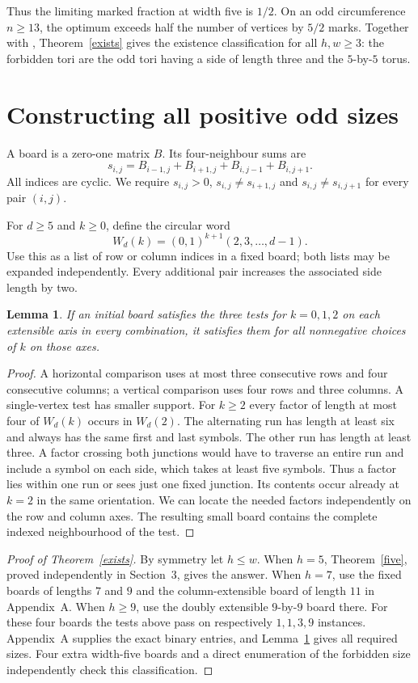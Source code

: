 \documentclass[11pt,a4paper]{article}
\newtheorem{lemma}[theorem]{Lemma}
\begin{document}
Thus the limiting marked fraction at width five is $1/2$. On an odd circumference $n\ge13$, the optimum exceeds half the number of vertices by $5/2$ marks. Together with \cite{princes}, Theorem~\ref{exists} gives the existence classification for all $h,w\ge3$: the forbidden tori are the odd tori having a side of length three and the $5$-by-$5$ torus.

\clearpage
\section{Constructing all positive odd sizes}
A board is a zero-one matrix $B$. Its four-neighbour sums are
\[
 s_{i,j}=B_{i-1,j}+B_{i+1,j}+B_{i,j-1}+B_{i,j+1}.
\]
All indices are cyclic. We require $s_{i,j}>0$, $s_{i,j}\ne s_{i+1,j}$ and $s_{i,j}\ne s_{i,j+1}$ for every pair $(i,j)$.

For $d\ge5$ and $k\ge0$, define the circular word
\[
 W_d(k)=(0,1)^{k+1}(2,3,\ldots,d-1).
\]
Use this as a list of row or column indices in a fixed board; both lists may be expanded independently. Every additional pair increases the associated side length by two.

\begin{lemma}\label{local}
If an initial board satisfies the three tests for $k=0,1,2$ on each extensible axis in every combination, it satisfies them for all nonnegative choices of $k$ on those axes.
\end{lemma}
\begin{proof}
A horizontal comparison uses at most three consecutive rows and four consecutive columns; a vertical comparison uses four rows and three columns. A single-vertex test has smaller support. For $k\ge2$ every factor of length at most four of $W_d(k)$ occurs in $W_d(2)$. The alternating run has length at least six and always has the same first and last symbols. The other run has length at least three. A factor crossing both junctions would have to traverse an entire run and include a symbol on each side, which takes at least five symbols. Thus a factor lies within one run or sees just one fixed junction. Its contents occur already at $k=2$ in the same orientation. We can locate the needed factors independently on the row and column axes. The resulting small board contains the complete indexed neighbourhood of the test.
\end{proof}

\begin{proof}[Proof of Theorem~\ref{exists}]
By symmetry let $h\le w$. When $h=5$, Theorem~\ref{five}, proved independently in Section~3, gives the answer. When $h=7$, use the fixed boards of lengths $7$ and $9$ and the column-extensible board of length $11$ in Appendix~A. When $h\ge9$, use the doubly extensible $9$-by-$9$ board there. For these four boards the tests above pass on respectively $1,1,3,9$ instances. Appendix~A supplies the exact binary entries, and Lemma~\ref{local} gives all required sizes. Four extra width-five boards and a direct enumeration of the forbidden size independently check this classification.
\end{proof}
\end{document}
